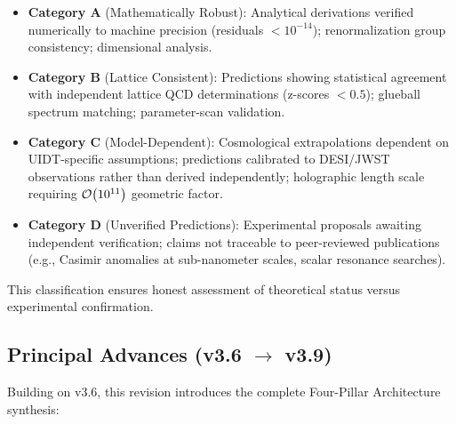 \documentclass[12pt,a4paper,twoside]{article}
\theoremstyle{plain}
\theoremstyle{definition}
\theoremstyle{remark}
\newcommand{\UIDT}{\textsc{UIDT}}
\begin{document}
\begin{itemize}
    \item \textbf{Category A} (Mathematically Robust): Analytical derivations 
    verified numerically to machine precision (residuals $< 10^{-14}$); 
    renormalization group consistency; dimensional analysis.
    
    \item \textbf{Category B} (Lattice Consistent): Predictions showing statistical 
    agreement with independent lattice QCD determinations (z-scores $< 0.5$); 
    glueball spectrum matching; parameter-scan validation.
    
    \item \textbf{Category C} (Model-Dependent): Cosmological extrapolations 
    dependent on \UIDT{}-specific assumptions; predictions calibrated to DESI/JWST 
    observations rather than derived independently; holographic length scale 
    requiring $\order{10^{11}}$ geometric factor.
    
    \item \textbf{Category D} (Unverified Predictions): Experimental proposals 
    awaiting independent verification; claims not traceable to peer-reviewed 
    publications (e.g., Casimir anomalies at sub-nanometer scales, scalar 
    resonance searches).
\end{itemize}

This classification ensures honest assessment of theoretical status versus 
experimental confirmation.

\subsection{Principal Advances (v3.6 \texorpdfstring{$\to$}{->} v3.9)}

Building on v3.6, this revision introduces the complete Four-Pillar Architecture synthesis:
\end{document}
